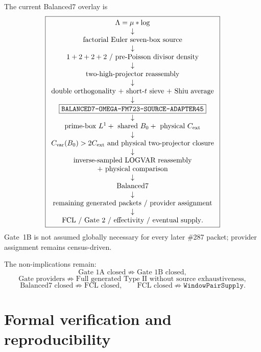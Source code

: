 \documentclass[11pt]{article}
\theoremstyle{definition}
\newcommand{\1}{\mathbf 1}
\begin{document}
The current Balanced7 overlay is
\[
\boxed{
\begin{array}{c}
\Lambda=\mu*\log\\
\downarrow\\
\text{factorial Euler seven-box source}\\
\downarrow\\
1+2+2+2\text{ / pre-Poisson divisor density}\\
\downarrow\\
\text{two-high-projector reassembly}\\
\downarrow\\
\text{double orthogonality + short-}t\text{ sieve + Shiu average}\\
\downarrow\\
\boxed{\texttt{BALANCED7-OMEGA-FM723-SOURCE-ADAPTER45}}\\
\downarrow\\
\text{prime-box }L^1+\text{ shared }B_0+\text{ physical }C_{\rm ext}\\
\downarrow\\
C_{\rm var}(B_0)>2C_{\rm ext}\ \text{and physical two-projector closure}\\
\downarrow\\
\text{inverse-sampled LOGVAR reassembly}\\
+\ \text{physical comparison}\\
\downarrow\\
\text{Balanced7}\\
\downarrow\\
\text{remaining generated packets / provider assignment}\\
\downarrow\\
\text{FCL / Gate 2 / effectivity / eventual supply}.
\end{array}}
\]
Gate~1B is not assumed globally necessary for every later \#287 packet; provider assignment
remains census-driven.

The non-implications remain:
\[
\text{Gate 1A closed}\not\Rightarrow\text{Gate 1B closed},
\]
\[
\text{Gate providers}\not\Rightarrow\text{Full generated Type II without source exhaustiveness},
\]
\[
\text{Balanced7 closed}\not\Rightarrow\text{FCL closed},
\qquad
\text{FCL closed}\not\Rightarrow\texttt{WindowPairSupply}.
\]


\section{Formal verification and reproducibility}
\end{document}
